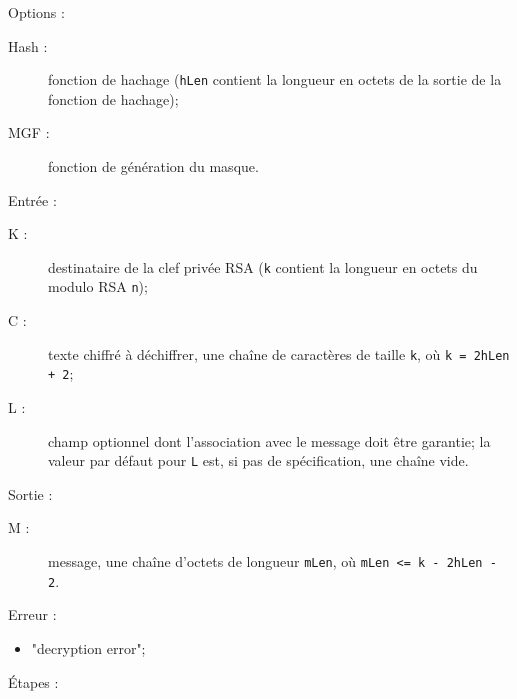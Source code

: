 Options :
\begin{description}
	\item [Hash :] fonction de hachage (\texttt{hLen} contient la longueur en octets de la sortie de la fonction de hachage);
   	\item [MGF :] fonction de génération du masque.\\
\end{description}
Entrée :
\begin{description}
   	\item [K :] destinataire de la clef privée RSA (\texttt{k} contient la longueur en octets du modulo RSA \texttt{n});
   	\item [C :] texte chiffré à déchiffrer, une chaîne de caractères de taille \texttt{k}, où \texttt{k = 2hLen + 2};
   	\item [L :] champ optionnel dont l'association avec le message doit être garantie; la valeur par défaut pour \texttt{L} est, si pas de spécification, une chaîne vide.\\
\end{description}
Sortie :
\begin{description}
    \item [M :] message, une chaîne d'octets de longueur \texttt{mLen}, où \texttt{mLen <= k - 2hLen - 2}.\\
\end{description}
Erreur : 
\begin{itemize}
	\item "decryption error";
\end{itemize}
Étapes :
